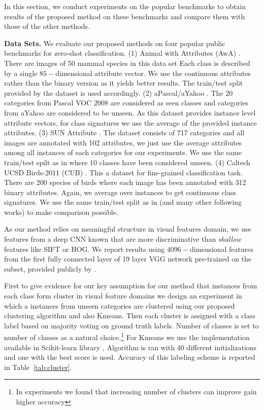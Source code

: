 \documentclass[10pt,twocolumn,letterpaper]{article}
\begin{document}
In this section, we conduct experiments on the popular benchmarks to obtain results of the proposed method on these benchmarks and compare them with those of the other methods.

\textbf{Data Sets.}
We evaluate our proposed methods on four popular public benchmarks for zero-shot classification.
(1) Animal with Attributes (AwA) \cite{lampert09}. There are images of 50 mammal species in this data set
Each class is described by a single $85-$dimensional attribute vector. We use the continuous attributes rather than
the binary version as it yields better results. The train/test split provided by the dataset is used accordingly.
(2) aPascal/aYahoo \cite{farhadi09}. The 20 categories from Pascal VOC 2008 \cite{pascal} are considered as seen classes and
categories from aYahoo are considered to be unseen. As this dataset provides instance level attribute vectors,
for class signatures we use the average of the provided instance attributes.
(3) SUN Attribute \cite{sun}. The dataset consists of 717 categories and all images are annotated with 102 attributes, we just
use the average attributes among all instances of each categories for our experiments. We use the same train/test spilt
as in \cite{jayaraman14} where 10 classes have been considered unseen.
(4) Caltech UCSD Birds-2011 (CUB) \cite{cub}. This a dataset for fine-grained classification task. There are 200 species of
birds where each image has been annotated with 312 binary attributes. Again, we average over instances to get continuous class signatures.
We use the same train/test split as in \cite{akata13} (and many other following works) to make comparison possible.


As our method relies on meaningful structure in visual features domain, we use features from a deep CNN known that are
 more discriminative than \textit{shallow} features like SIFT or HOG. We report results using
  $4096-$dimensional features from the first fully connected layer of 19 layer VGG network \cite{vgg}
pre-trained on the subset, provided publicly by \cite{sse}.

First to give evidence for  our key assumption for our method that instances from each class form cluster in visual feature domains we design an
experiment in which a instances from unseen categories are clustered using our proposed clustering algorithm and also Kmeans. Then
 each cluster is assigned with a class label based on majority voting on ground truth labels. Number of classes
 is set to number of classes as a natural choice.\footnote{In experiments we found that increasing number of clusters can improve gain higher accuracy}
For Kmeans we use the implementation available in Scikit-learn library \cite{scikit-learn}, Algorithm is ran with 40 different initializations
and one with the best score is used.
  Accuracy of this labeling scheme is reported in Table~\ref{tab:cluster}.
\end{document}
